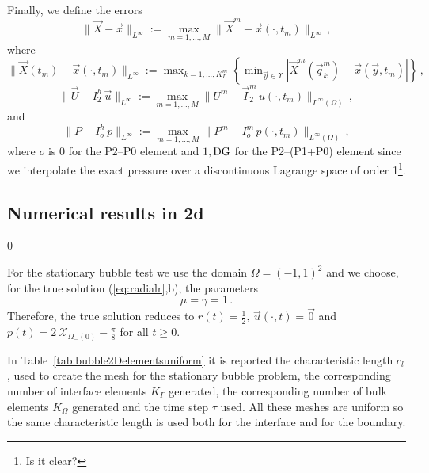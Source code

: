 \documentclass[a4paper,12pt,onecolumn]{article}
\newcommand{\bigchi}{\ensuremath{\mathrm{\mathcal{X}}}}
\newcommand{\charfcn}[1]{\bigchi_{#1}} %
\newcommand{\errorXx}{\|\vec{X} - \vec{x}\|_{L^\infty}}
\newcommand{\errorUu}[1]{\|\vec U - I^h_{#1}\,\vec u\|_{L^\infty}}
\newcommand{\errorPp}[1]{\|P - I^h_{#1}\,p\|_{L^\infty}}
\begin{document}
Finally, we define the errors 
\begin{equation*}
\errorXx := \max_{m=1,\ldots, M} \|\vec{X}^m - \vec{x}(\cdot,t_m)\|_{L^\infty}\,, 
\end{equation*}
where $\|\vec{X}(t_m) - \vec{x}(\cdot,t_m)\|_{L^\infty} :=\max_{k=1,\ldots, K^m_\Gamma} \left\{\min_{\vec{y}\in \Upsilon} |\vec{X}^m(\vec{q}^m_k) - \vec{x}(\vec{y},t_m)|\right\}\,,$
\begin{equation*} 
\errorUu2 := \max_{m=1,\ldots, M}\|U^m - \vec I^m_2\,u(\cdot,t_m)\|_{L^\infty(\Omega)}\,, 
\end{equation*}
and
\begin{equation*}
\errorPp{o} := \max_{m=1,\ldots, M}\|P^m - I^m_o\,p(\cdot,t_m)\|_{L^\infty(\Omega)}\,,
\end{equation*}
where $o$ is 0 for the P2--P0 element and $1,\rm{DG}$ for the P2--(P1+P0) element since we interpolate the exact pressure over a discontinuous Lagrange space of order 1\footnote{Is it clear?}.

\subsection{Numerical results in 2d} \label{subsec:numerical_results_2d}
\setcounter{equation} 0

For the stationary bubble test we use the domain $\Omega = (-1,1)^2$ and we choose, for the true solution (\ref{eq:radialr},b), the parameters
\begin{equation*}
\mu = \gamma = 1\,. 
\end{equation*}
Therefore, the true solution reduces to $r(t) = \frac{1}{2}$, $\vec u(\cdot, t) = \vec 0$ and $p(t) = 2\,\charfcn{\Omega_-(0)} - \frac{\pi}{8}$ for all $t \geq 0$.

In Table~\ref{tab:bubble2Delementsuniform} it is reported the characteristic length $c_l$, used to create the mesh for the stationary bubble problem, the corresponding number of interface elements $K_\Gamma$ generated, the corresponding number of bulk elements $K_\Omega$ generated and the time step $\tau$ used. All these meshes are uniform so the same characteristic length is used both for the interface and for the boundary. 
\end{document}
